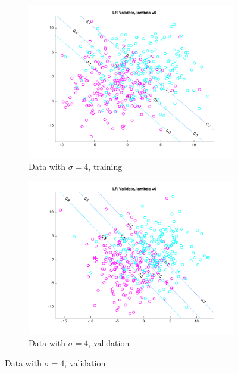 \begin{figure}[h!]
    \begin{subfigure}[b]{0.4\textwidth}
	\includegraphics[scale=0.4]{hw2_1_stdev4_a_0.pdf}
	\caption{Data with $\sigma = 4$, training}\label{fig:data_stdev4a}
    \end{subfigure}  
    \quad
    \begin{subfigure}[b]{0.4\textwidth}
	\includegraphics[scale=0.4]{hw2_1_stdev4_b_0.pdf}
	\caption{Data with $\sigma = 4$, validation}\label{fig:data_stdev4b}
    \end{subfigure}  


\end{figure}
